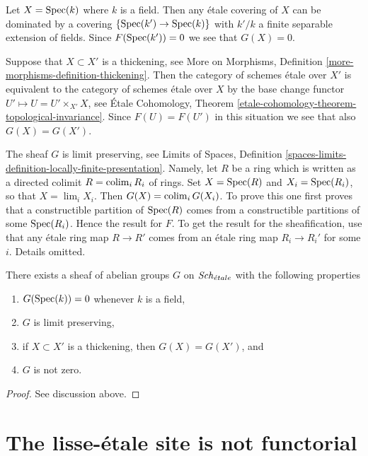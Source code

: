 \medskip\noindent
Let $X = \mathop{\mathrm{Spec}}(k)$ where $k$ is a field.
Then any \'etale covering of $X$ can be dominated
by a covering $\{\mathop{\mathrm{Spec}}(k') \to \mathop{\mathrm{Spec}}(k)\}$ with $k'/k$
a finite separable extension of fields. Since $F(\mathop{\mathrm{Spec}}(k')) = 0$
we see that $G(X) = 0$.

\medskip\noindent
Suppose that $X \subset X'$ is a thickening, see
More on Morphisms, Definition \ref{more-morphisms-definition-thickening}.
Then the category of schemes \'etale over $X'$ is equivalent to the
category of schemes \'etale over $X$ by the base change functor
$U' \mapsto U = U' \times_{X'} X$, see
\'Etale Cohomology,
Theorem \ref{etale-cohomology-theorem-topological-invariance}.
Since $F(U) = F(U')$ in this situation we see that also $G(X) = G(X')$.

\medskip\noindent
The sheaf $G$ is limit preserving, see
Limits of Spaces,
Definition \ref{spaces-limits-definition-locally-finite-presentation}.
Namely, let $R$ be a ring which is written as a directed colimit
$R = \mathop{\mathrm{colim}}\nolimits_i R_i$ of rings. Set $X = \mathop{\mathrm{Spec}}(R)$ and
$X_i = \mathop{\mathrm{Spec}}(R_i)$, so that $X = \lim_i X_i$. Then
$G(X) = \mathop{\mathrm{colim}}\nolimits_i G(X_i)$. To prove this one first proves that
a constructible partition of $\mathop{\mathrm{Spec}}(R)$ comes from a constructible
partitions of some $\mathop{\mathrm{Spec}}(R_i)$. Hence the result for $F$. To
get the result for the sheafification, use that any \'etale ring map
$R \to R'$ comes from an \'etale ring map $R_i \to R_i'$ for some $i$.
Details omitted.

\begin{lemma}
\label{lemma-weird-sheaf}
There exists a sheaf of abelian groups $G$ on
$\mathit{Sch}_{\acute{e}tale}$ with the following properties
\begin{enumerate}
\item $G(\mathop{\mathrm{Spec}}(k)) = 0$ whenever $k$ is a field,
\item $G$ is limit preserving,
\item if $X \subset X'$ is a thickening, then $G(X) = G(X')$, and
\item $G$ is not zero.
\end{enumerate}
\end{lemma}

\begin{proof}
See discussion above.
\end{proof}




\section{The lisse-\'etale site is not functorial}
\label{section-lisse-etale-not-functorial}

